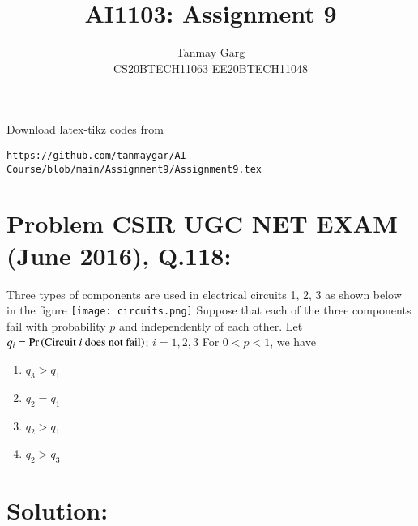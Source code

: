 \documentclass[journal,12pt,twocolumn]{IEEEtran}
\begin{document}
     \def\rightbox#1{\makebox[0in][r]{#1}}
     \def\centbox#1{\makebox[0in]{#1}}
     \def\topbox#1{\raisebox{-\baselineskip}[0in][0in]{#1}}
     \def\midbox#1{\raisebox{-0.5\baselineskip}[0in][0in]{#1}}
\vspace{3cm}
\title{AI1103: Assignment 9}
\author{Tanmay Garg \\CS20BTECH11063 EE20BTECH11048}
\maketitle
\newpage
\bigskip
\renewcommand{\thefigure}{\theenumi}
\renewcommand{\thetable}{\theenumi}
%
Download latex-tikz codes from 
%
\begin{lstlisting}
https://github.com/tanmaygar/AI-Course/blob/main/Assignment9/Assignment9.tex
\end{lstlisting}
\section*{Problem CSIR UGC NET EXAM (June 2016), Q.118: }
Three types of components are used in electrical circuits 1, 2, 3 as shown below in the figure
\texttt{[image: circuits.png]}
Suppose that each of the three components fail with probability $p$ and independently of each other. Let $q_i = \Pr\left(\text{Circuit $i$ does not fail}\right)$; $i=1,2,3$ For $0<p<1$, we have
\begin{multicols}{2}
    \begin{enumerate}
        \item $q_3>q_1$
        \item $q_2=q_1$
        \item $q_2>q_1$
        \item $q_2>q_3$
    \end{enumerate}
\end{multicols}

\section*{Solution:}

\end{document}
